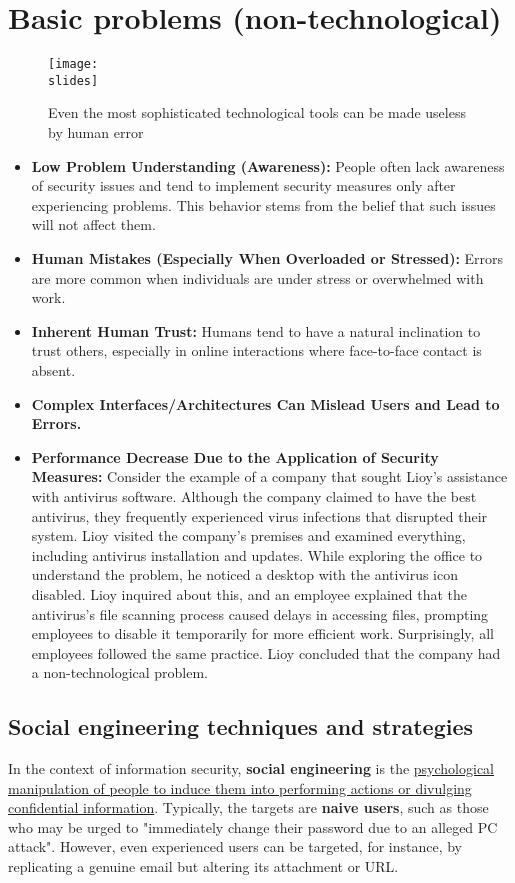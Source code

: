 \section{Basic problems (non-technological)}
\begin{figure}[h]
  \centering
  \texttt{[image: \\slides]}
  \caption{Even the most sophisticated technological tools can be
    made useless by human error}
\end{figure}

\begin{itemize}
  \item \textbf{Low Problem Understanding (Awareness):} People often lack awareness of security issues and tend to implement security measures only after experiencing problems. This behavior stems from the belief that such issues will not affect them.
  \item \textbf{Human Mistakes (Especially When Overloaded or Stressed):} Errors are more common when individuals are under stress or overwhelmed with work.
  \item \textbf{Inherent Human Trust:} Humans tend to have a natural inclination to trust others, especially in online interactions where face-to-face contact is absent.
  \item \textbf{Complex Interfaces/Architectures Can Mislead Users and Lead to Errors.}
  \item \textbf{Performance Decrease Due to the Application of Security Measures:} Consider the example of a company that sought Lioy's assistance with antivirus software. Although the company claimed to have the best antivirus, they frequently experienced virus infections that disrupted their system. Lioy visited the company's premises and examined everything, including antivirus installation and updates. While exploring the office to understand the problem, he noticed a desktop with the antivirus icon disabled. Lioy inquired about this, and an employee explained that the antivirus's file scanning process caused delays in accessing files, prompting employees to disable it temporarily for more efficient work. Surprisingly, all employees followed the same practice. Lioy concluded that the company had a non-technological problem.
\end{itemize}

\subsection*{Social engineering techniques and strategies}
In the context of information security, \textbf{social engineering} is the \ul{psychological manipulation of people to induce them into performing actions or divulging confidential information}. Typically, the targets are \textbf{naive users}, such as those who may be urged to "immediately change their password due to an alleged PC attack". However, even experienced users can be targeted, for instance, by replicating a genuine email but altering its attachment or URL.

